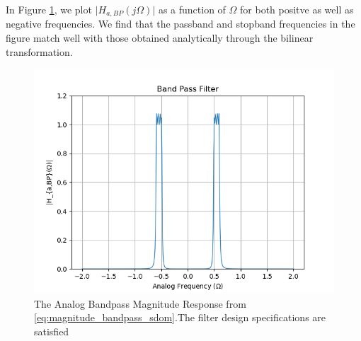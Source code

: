 \documentclass{article}
\begin{document}
\begin{enumerate}
In Figure \ref{fig:band_pass_filter_IIR}, we plot $\vert H_{a,BP}(j\Omega)\vert$ as a function of $\Omega$ for both positve as
well as negative frequencies.  We find that the passband and stopband frequencies in the figure
match well with those obtained analytically through the bilinear transformation.
\begin{figure}[H]
\centering
\includegraphics[width=1\columnwidth]{figs/Band_Pass_Filter.png}
\caption{The Analog Bandpass Magnitude Response from \eqref{eq:magnitude_bandpass_sdom}.The filter design specifications are satisfied}
\label{fig:band_pass_filter_IIR}
\end{figure}
\end{enumerate}
\end{document}
